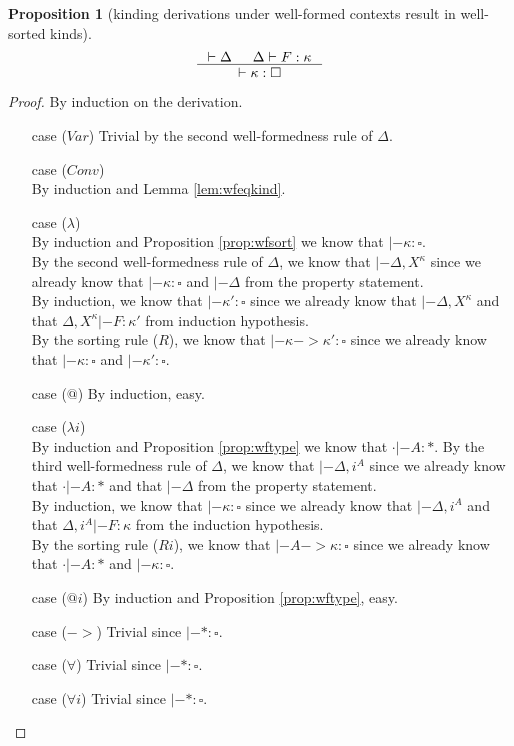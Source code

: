 \documentclass[preprint]{sigplanconf}
\theoremstyle{plain}
\newtheorem{proposition}{Proposition}
\theoremstyle{remark}
\theoremstyle{definition}
\begin{document}
\begin{proposition}[kinding derivations under well-formed contexts
	       	result in well-sorted kinds]
\label{prop:wfkind}
\[ \inference{ |- \Delta & \Delta |- F : \kappa}{ |- \kappa:\square }
\]
\end{proposition}
\begin{proof} By induction on the derivation.
\begin{itemize}
\item[case] ($Var$)
	Trivial by the second well-formedness rule of $\Delta$.
\item[case] ($Conv$) \\
	By induction and Lemma \ref{lem:wfeqkind}.
\item[case] ($\lambda$) \\
	By induction and Proposition \ref{prop:wfsort} we know
	that $|- \kappa:\square$.\\
	By the second well-formedness rule of $\Delta$,
	we know that $|- \Delta,X^\kappa$ since we already know
	that $|- \kappa:\square$ and $|- \Delta$ from the property statement.\\
	By induction, we know that $|- \kappa':\square$
	since we already know that $|- \Delta,X^\kappa$ and
	that $\Delta,X^\kappa|- F:\kappa'$ from induction hypothesis.\\
	By the sorting rule ($R$), we know that $|- \kappa -> \kappa':\square$
	since we already know that $|- \kappa:\square$ and $|- \kappa':\square$.
\item[case] ($@$)
	By induction, easy.
\item[case] ($\lambda i$)\\
	By induction and Proposition \ref{prop:wftype} we know
	that $\cdot|- A:*$.
	By the third well-formedness rule of $\Delta$,
	we know that $|- \Delta,i^A$ since we already know that $\cdot|- A:*$ and
	that $|- \Delta$ from the property statement.\\
	By induction, we know that $|- \kappa:\square$
	since we already know that $|- \Delta,i^A$ and
	that $\Delta,i^A|- F:\kappa$ from the induction hypothesis.\\
	By the sorting rule ($Ri$), we know that $|- A -> \kappa:\square$
	since we already know that $\cdot |- A:*$ and $|- \kappa:\square$.
\item[case] ($@i$)
	By induction and Proposition \ref{prop:wftype}, easy.
\item[case] ($->$)
	Trivial since $|- * : \square$.
\item[case] ($\forall$)
	Trivial since $|- * : \square$.
\item[case] ($\forall i$)
	Trivial since $|- * : \square$.
\end{itemize}
\end{proof}
\end{document}
